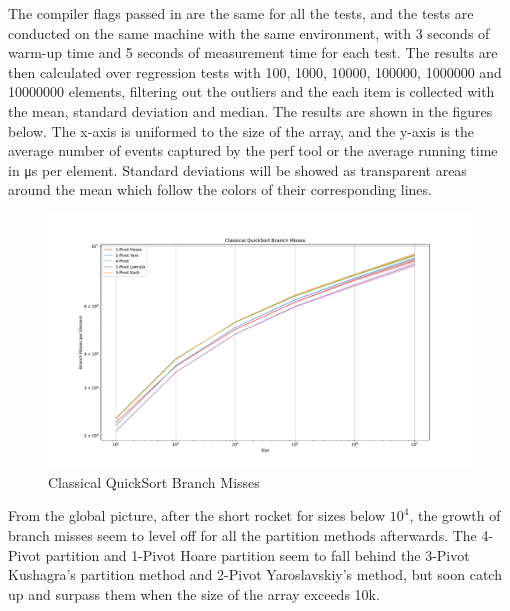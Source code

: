 \documentclass{article}
\begin{document}
The compiler flags passed in are the same for all the tests, and the tests are conducted on the same machine with the same environment,
with 3 seconds of warm-up time and 5 seconds of measurement time for each test. The results are then calculated over regression tests with 100, 1000, 10000, 100000, 1000000 and 10000000 elements,
filtering out the outliers and the each item is collected with the mean, standard deviation and median. The results are shown in the figures below.
The x-axis is uniformed to the size of the array, and the y-axis is the average number of events captured by the perf tool or the average running time in μs per element.
Standard deviations will be showed as transparent areas around the mean which follow the colors of their corresponding lines.
\begin{center}
\begin{figure}[H]
    \hypertarget{fig:classicalbranchmiss}{}
    \caption{Classical QuickSort Branch Misses}
    \centering
    \hspace*{-0.27\textwidth}
    \includegraphics[width=1.5\textwidth]{Classical QuickSort Branch Misses.pdf}
\end{figure}
\end{center}

From the global picture, after the short rocket for sizes below $10^4$, the growth of branch misses seem to level off for all the partition methods afterwards. 
The 4-Pivot partition and 1-Pivot Hoare partition seem to fall behind the 3-Pivot Kushagra's partition method and 2-Pivot Yaroslavskiy's method, but soon catch up and surpass them when the size of the array exceeds 10k.
\end{document}
